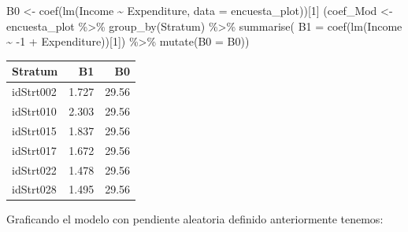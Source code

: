 \documentclass[
  12pt,
]{book}
\newenvironment{Shaded}{\begin{snugshade}}{\end{snugshade}}
\newcommand{\AttributeTok}[1]{\textcolor[rgb]{0.77,0.63,0.00}{#1}}
\newcommand{\DecValTok}[1]{\textcolor[rgb]{0.00,0.00,0.81}{#1}}
\newcommand{\FunctionTok}[1]{\textcolor[rgb]{0.00,0.00,0.00}{#1}}
\newcommand{\NormalTok}[1]{#1}
\newcommand{\OtherTok}[1]{\textcolor[rgb]{0.56,0.35,0.01}{#1}}
\newcommand{\SpecialCharTok}[1]{\textcolor[rgb]{0.00,0.00,0.00}{#1}}
\begin{document}
\begin{Shaded}
\begin{Highlighting}[]
\NormalTok{B0 }\OtherTok{\textless{}{-}} \FunctionTok{coef}\NormalTok{(}\FunctionTok{lm}\NormalTok{(Income }\SpecialCharTok{\textasciitilde{}}\NormalTok{ Expenditure,}
              \AttributeTok{data =}\NormalTok{ encuesta\_plot))[}\DecValTok{1}\NormalTok{]}
\NormalTok{(coef\_Mod }\OtherTok{\textless{}{-}}\NormalTok{ encuesta\_plot }\SpecialCharTok{\%\textgreater{}\%} \FunctionTok{group\_by}\NormalTok{(Stratum) }\SpecialCharTok{\%\textgreater{}\%} 
  \FunctionTok{summarise}\NormalTok{(}
    \AttributeTok{B1 =} \FunctionTok{coef}\NormalTok{(}\FunctionTok{lm}\NormalTok{(Income }\SpecialCharTok{\textasciitilde{}} \SpecialCharTok{{-}}\DecValTok{1} \SpecialCharTok{+}\NormalTok{ Expenditure))[}\DecValTok{1}\NormalTok{]) }\SpecialCharTok{\%\textgreater{}\%} 
  \FunctionTok{mutate}\NormalTok{(}\AttributeTok{B0 =}\NormalTok{ B0))}
\end{Highlighting}
\end{Shaded}

\begin{tabular}{l|r|r}
\hline
Stratum & B1 & B0\\
\hline
idStrt002 & 1.727 & 29.56\\
\hline
idStrt010 & 2.303 & 29.56\\
\hline
idStrt015 & 1.837 & 29.56\\
\hline
idStrt017 & 1.672 & 29.56\\
\hline
idStrt022 & 1.478 & 29.56\\
\hline
idStrt028 & 1.495 & 29.56\\
\hline
\end{tabular}

Graficando el modelo con pendiente aleatoria definido anteriormente tenemos:
\end{document}
